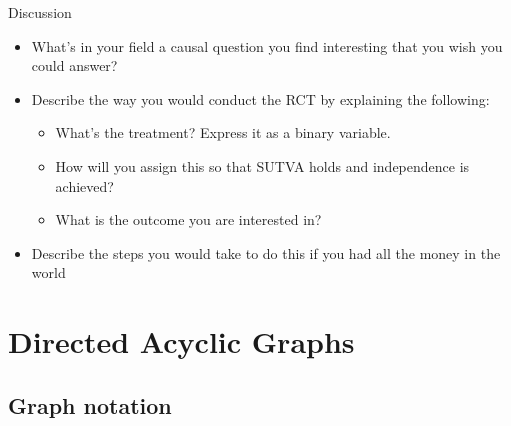 \documentclass{beamer}
\begin{document}
\begin{frame}{Discussion}

  \begin{itemize}
    \item What's in your field a causal question you find interesting that you wish you could answer?
    \item Describe the way you would conduct the RCT by explaining the following:
          \begin{itemize}
            \item What's the treatment?  Express it as a binary variable.
            \item How will you assign this so that SUTVA holds and independence is achieved?
            \item What is the outcome you are interested in?
          \end{itemize}
    \item Describe the steps you would take to do this if you had all the money in the world
  \end{itemize}

\end{frame}


\section{Directed Acyclic Graphs}

\subsection{Graph notation}
\end{document}

